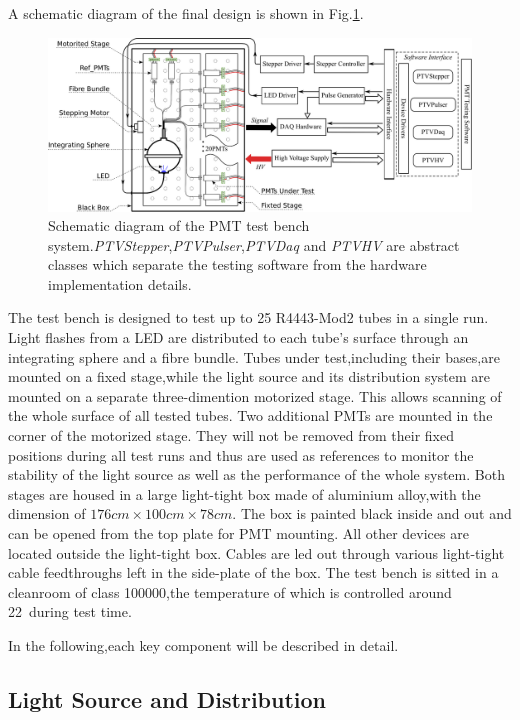 \documentclass[preprint,5p,times]{elsarticle}
\begin{document}
A schematic diagram of the final design is shown in Fig.\ref{fig:testbench_overveiw}.
\begin{figure}[hb]
 \centering
 \includegraphics[width=140mm]{testbench_overview}
\caption{Schematic diagram of the PMT test bench system.\textit{PTVStepper},\textit{PTVPulser},\textit{PTVDaq} and \textit{PTVHV} are abstract classes which separate the testing software from the hardware implementation details.}
\label{fig:testbench_overveiw}
\end{figure}
The test bench is designed to test up to 25 R4443-Mod2 tubes in a single run.
Light flashes from a LED are distributed to each tube's surface through an integrating sphere and a fibre bundle.
Tubes under test,including their bases,are mounted on a fixed stage,while the light source and its distribution system are mounted on a separate three-dimention motorized stage.
This allows scanning of the whole surface of all tested tubes.
Two additional PMTs are mounted in the corner of the motorized stage.
They will not be removed from their fixed positions during all test runs and thus are used as references to monitor the stability of the light source as well as the performance of the whole system.
Both stages are housed in a large light-tight box made of aluminium alloy,with the dimension of $176cm\times100cm\times78cm$.
The box is painted black inside and out and can be opened from the top plate for PMT mounting.
All other devices are located outside the light-tight box.
Cables are led out through various light-tight cable feedthroughs left in the side-plate of the box.
The test bench is sitted in a cleanroom of class 100000,the temperature of which is controlled around 22\textcelsius~during test time.

In the following,each key component will be described in detail.
\subsection{Light Source and Distribution}
\label{sec:light_source}
\end{document}
